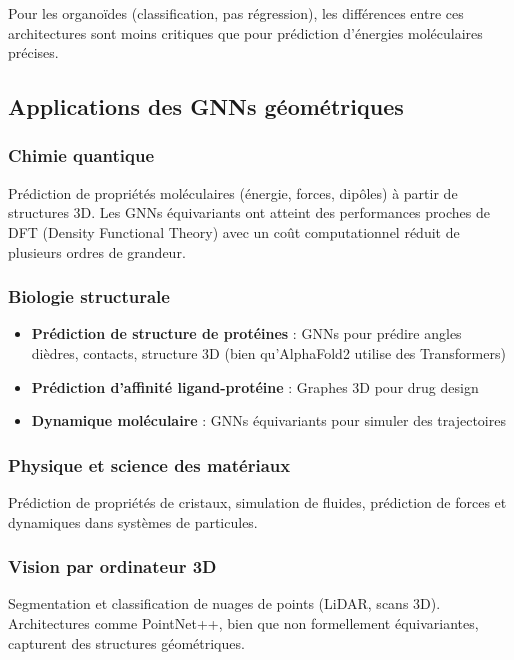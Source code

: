 Pour les organoïdes (classification, pas régression), les différences entre ces architectures sont moins critiques que pour prédiction d'énergies moléculaires précises.

\subsection{Applications des GNNs géométriques}

\subsubsection{Chimie quantique}

Prédiction de propriétés moléculaires (énergie, forces, dipôles) à partir de structures 3D. Les GNNs équivariants ont atteint des performances proches de DFT (Density Functional Theory) avec un coût computationnel réduit de plusieurs ordres de grandeur.

\subsubsection{Biologie structurale}

\begin{itemize}
    \item \textbf{Prédiction de structure de protéines} : GNNs pour prédire angles dièdres, contacts, structure 3D (bien qu'AlphaFold2 utilise des Transformers)
    \item \textbf{Prédiction d'affinité ligand-protéine} : Graphes 3D pour drug design
    \item \textbf{Dynamique moléculaire} : GNNs équivariants pour simuler des trajectoires
\end{itemize}

\subsubsection{Physique et science des matériaux}

Prédiction de propriétés de cristaux, simulation de fluides, prédiction de forces et dynamiques dans systèmes de particules.

\subsubsection{Vision par ordinateur 3D}

Segmentation et classification de nuages de points (LiDAR, scans 3D). Architectures comme PointNet++, bien que non formellement équivariantes, capturent des structures géométriques.

